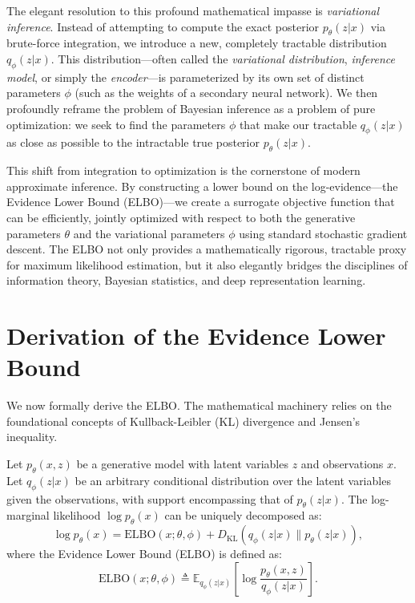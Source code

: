 The elegant resolution to this profound mathematical impasse is \textit{variational inference}. Instead of attempting to compute the exact posterior $p_\theta(z|x)$ via brute-force integration, we introduce a new, completely tractable distribution $q_\phi(z|x)$. This distribution—often called the \textit{variational distribution}, \textit{inference model}, or simply the \textit{encoder}—is parameterized by its own set of distinct parameters $\phi$ (such as the weights of a secondary neural network). We then profoundly reframe the problem of Bayesian inference as a problem of pure optimization: we seek to find the parameters $\phi$ that make our tractable $q_\phi(z|x)$ as close as possible to the intractable true posterior $p_\theta(z|x)$.

This shift from integration to optimization is the cornerstone of modern approximate inference. By constructing a lower bound on the log-evidence—the Evidence Lower Bound (ELBO)—we create a surrogate objective function that can be efficiently, jointly optimized with respect to both the generative parameters $\theta$ and the variational parameters $\phi$ using standard stochastic gradient descent. The ELBO not only provides a mathematically rigorous, tractable proxy for maximum likelihood estimation, but it also elegantly bridges the disciplines of information theory, Bayesian statistics, and deep representation learning.

\section{Derivation of the Evidence Lower Bound}

We now formally derive the ELBO. The mathematical machinery relies on the foundational concepts of Kullback-Leibler (KL) divergence and Jensen's inequality. 

\begin{theorem}
\label{thm:elbo_decomp}
Let $p_\theta(x, z)$ be a generative model with latent variables $z$ and observations $x$. Let $q_\phi(z|x)$ be an arbitrary conditional distribution over the latent variables given the observations, with support encompassing that of $p_\theta(z|x)$. The log-marginal likelihood $\log p_\theta(x)$ can be uniquely decomposed as:
\begin{equation}
    \log p_\theta(x) = \mathrm{ELBO}(x; \theta, \phi) + D_{\mathrm{KL}}(q_\phi(z|x) \parallel p_\theta(z|x)),
\end{equation}
where the Evidence Lower Bound (ELBO) is defined as:
\begin{equation}
    \mathrm{ELBO}(x; \theta, \phi) \triangleq \mathbb{E}_{q_\phi(z|x)}\left[ \log \frac{p_\theta(x, z)}{q_\phi(z|x)} \right].
\end{equation}
\end{theorem}

